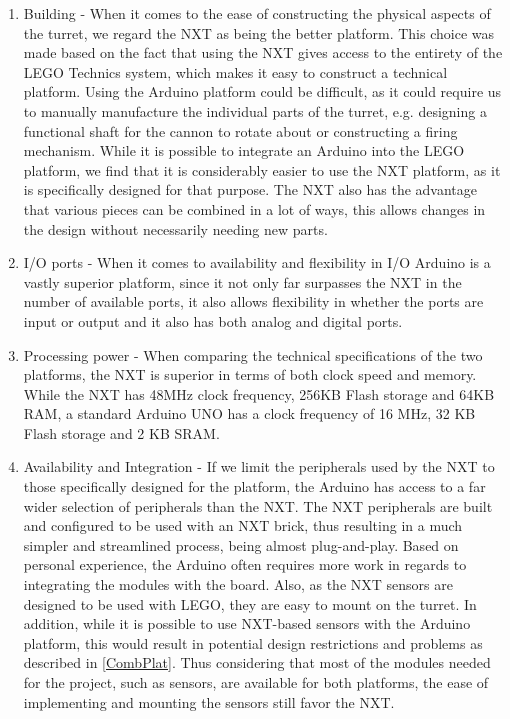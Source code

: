 
\begin{enumerate}
  \item Building - When it comes to the ease of constructing the physical
  aspects of the turret, we regard the NXT as being the better platform. This
  choice was made based on the fact that using the NXT gives access to the
  entirety of the LEGO Technics system, which makes it easy to construct a
  technical platform. Using the Arduino platform could be difficult, as it could
  require us to manually manufacture the individual parts of the turret, e.g.
  designing a functional shaft for the cannon to rotate about or constructing a
  firing mechanism.
  While it is possible to integrate an Arduino into the LEGO platform, we find
  that it is considerably easier to use the NXT platform, as it is specifically
  designed for that purpose. The NXT also has the advantage that various
  pieces can be combined in a lot of ways, this allows changes in the design
  without necessarily needing new parts.

  \item I/O ports - When it comes to availability and flexibility in I/O
  Arduino is a vastly superior platform, since it not only far surpasses the NXT
  in the number of available ports, it also allows flexibility in whether the
  ports are input or output and it also has both analog and digital ports.
  
  \item Processing power - When comparing the technical specifications of the
  two platforms, the NXT is superior in terms of both clock speed and memory.
  While the NXT has 48MHz clock frequency, 256KB Flash storage and 64KB RAM, a
  standard Arduino UNO has a clock frequency of 16 MHz, 32 KB Flash storage and
  2 KB SRAM.
  
  \item Availability and Integration - If we limit the peripherals used by the
  NXT to those specifically designed for the platform, the Arduino has access
  to a far wider selection of peripherals than the NXT. The NXT
  peripherals are built and configured to be used with an NXT brick, thus
  resulting in a much simpler and streamlined process, being almost
  plug-and-play. Based on personal experience, the Arduino often requires more
  work in regards to integrating the modules with the board. Also, as the NXT
  sensors are designed to be used with LEGO, they are easy to mount on the
  turret. In addition, while it is possible to use NXT-based sensors with the
  Arduino platform, this would result in potential design restrictions and
  problems as described in \autoref{CombPlat}. Thus considering that most of
  the modules needed for the project, such as sensors, are available for both
  platforms, the ease of implementing and mounting the sensors still favor the
  NXT.
\end{enumerate}

